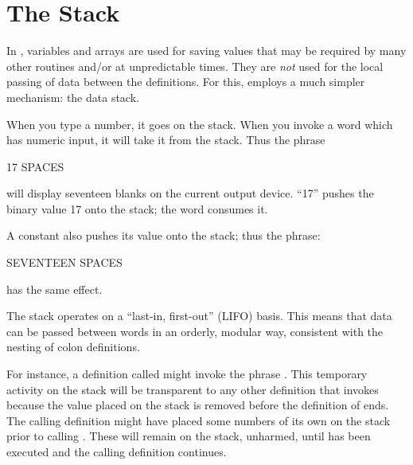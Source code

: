 \section{The Stack}
In \Forth{}, variables and arrays are used for saving values that may be
required by many other routines and/or at unpredictable times.  They are
\emph{not} used for the local passing of data between the definitions.
For this, \Forth{} employs a much simpler mechanism: the data stack.

When you type a number, it goes on the stack.  When you invoke a word
which has numeric input, it will take it from the stack.  Thus the phrase
\begin{Code}
17 SPACES
\end{Code}
will display seventeen blanks on the current output device.  ``17'' pushes
the binary value 17 onto the stack; the word  consumes it.

A constant also pushes its value onto the stack; thus the phrase:
\begin{Code}
SEVENTEEN SPACES
\end{Code}
has the same effect.

The stack operates on a ``last-in, first-out'' (LIFO) basis.  This means
that data can be passed between words in an orderly, modular way,
consistent with the nesting of colon definitions.

For instance, a definition called  might invoke the phrase
.  This temporary activity on the stack will be
transparent to any other definition that invokes  because the
value placed on the stack is removed before the definition of 
ends.  The calling definition might have placed some numbers of its own on
the stack prior to calling .  These will remain on the stack,
unharmed, until  has been executed and the calling definition
continues.


